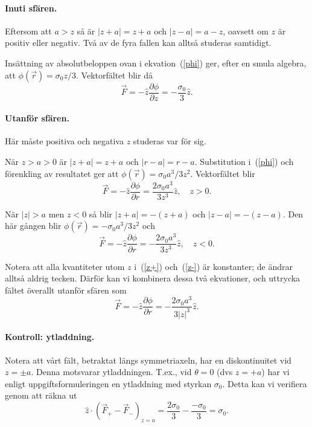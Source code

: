 \documentclass[%
oneside,                 %
final,                   %
10pt]{article}
\newenvironment{doconceexercise}{}{}
\begin{document}
\begin{doconceexercise}
\paragraph{Inuti sfären.}
Eftersom att $a>z$ så är $|z+a|=z+a$ och $|z-a|=a-z$, oavsett om $z$ är positiv eller negativ. Två av de fyra fallen kan alltså studeras samtidigt. 

Insättning av absolutbeloppen ovan i ekvation~(\ref{phi}) ger, efter en smula algebra, att $\phi(\vec r)=\sigma_0 z/3$. Vektorfältet blir då
\begin{equation}
    \vec F =-\hat z\frac{\partial\phi}{\partial z}=-\frac{\sigma_0}3\hat z.
\end{equation}

\paragraph{Utanför sfären.}
Här måste positiva och negativa $z$ studeras var för sig.

När $z>a>0$ är $|z+a|=z+a$ och $|r-a|=r-a$. Substitution i~(\ref{phi}) och förenkling av resultatet ger att $\phi(\vec r)=\sigma_0a^3/3z^2$. Vektorfältet blir 
\begin{equation}
    \vec F =-\hat z\frac{\partial\phi}{\partial r}=\frac{2\sigma_0a^3}{3z^3}\hat z,\quad z>0. \label{z+}
\end{equation}

När $|z|>a$ men $z<0$ så blir $|z+a|=-(z+a)$ och $|z-a|=-(z-a)$. Den här gången blir $\phi(\vec r)=-\sigma_0a^3/3z^2$ och 
\begin{equation}
    \vec F =-\hat z\frac{\partial\phi}{\partial r}=-\frac{2\sigma_0a^3}{3z^3}\hat z,\quad z<0.\label{z-}
\end{equation}

Notera att alla kvantiteter utom $z$ i~(\ref{z+}) och~(\ref{z-}) är konstanter; de ändrar alltså aldrig tecken. Därför kan vi kombinera dessa två ekvationer, och uttrycka fältet överallt utanför sfären som
\begin{equation}
    \vec F =-\hat z\frac{\partial\phi}{\partial r}=-\frac{2\sigma_0a^3}{3|z|^3}\hat z.
\end{equation}

\paragraph{Kontroll: ytladdning.}
Notera att vårt fält, betraktat längs symmetriaxeln, har en diskontinuitet vid $z=\pm a$. Denna motsvarar ytladdningen. T.ex., vid $\theta = 0$ (dvs $z=+a$) har vi enligt uppgiftsformuleringen en ytladdning med styrkan $\sigma_0$. Detta kan vi verifiera genom att räkna ut
\begin{equation}
\hat{z} \cdot \left( \vec{F}_+ - \vec{F}_- \right)_{z=a} = \frac{2\sigma_0}{3} - \frac{-\sigma_0}{3} = \sigma_0.
\end{equation}


\end{doconceexercise}


\end{document}
